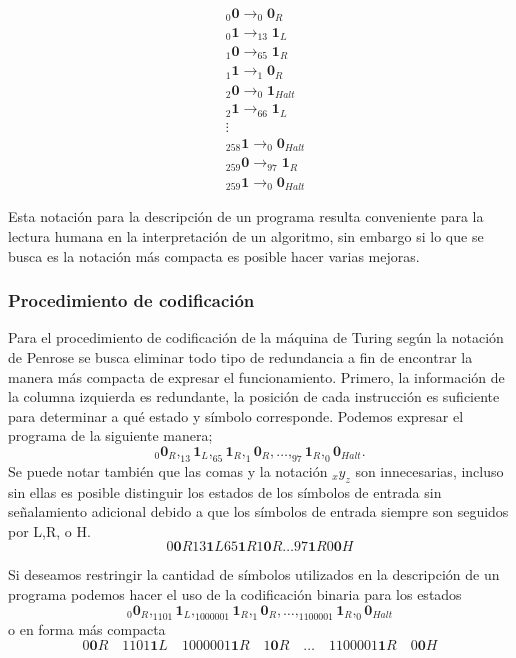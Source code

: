 \documentclass[10pt,a4paper]{article}
\begin{document}
\begin{align*}
	&_{0}\textbf{0} \rightarrow _{0}\textbf{0}_{R} \\
	&_{0}\textbf{1} \rightarrow _{13}\textbf{1}_{L} \\
	&_{1}\textbf{0} \rightarrow _{65}\textbf{1}_{R} \\
	&_{1}\textbf{1} \rightarrow _{1}\textbf{0}_{R} \\
	&_{2}\textbf{0} \rightarrow _{0}\textbf{1}_{Halt} \\
	&_{2}\textbf{1} \rightarrow _{66}\textbf{1}_{L} \\
	& \vdots \\
	&_{258}\textbf{1} \rightarrow _{0}\textbf{0}_{Halt} \\
	&_{259}\textbf{0} \rightarrow _{97}\textbf{1}_{R} \\
	&_{259}\textbf{1} \rightarrow _{0}\textbf{0}_{Halt}
\end{align*}

Esta notación para la descripción de un programa resulta conveniente para la lectura humana en la interpretación de un algoritmo, sin embargo si lo que se busca es la notación más compacta es posible hacer varias mejoras.

\subsubsection{Procedimiento de codificación}
Para el procedimiento de codificación de la máquina de Turing según la notación de Penrose se busca eliminar todo tipo de redundancia a fin de encontrar la manera más compacta de expresar el funcionamiento. Primero, la información de la columna izquierda es redundante, la posición de cada instrucción es suficiente para determinar a qué estado y símbolo corresponde. Podemos expresar el programa de la siguiente manera;
\[
	_{0}\textbf{0}_{R}, _{13}\textbf{1}_{L}, _{65}\textbf{1}_{R}, _{1}\textbf{0}_{R}, \dots, _{97}\textbf{1}_{R}, _{0}\textbf{0}_{Halt}.
\]
Se puede notar también que las comas y la notación $_{x}y_z$ son innecesarias, incluso sin ellas es posible distinguir los estados de los símbolos de entrada sin señalamiento adicional debido a que los símbolos de entrada siempre son seguidos por  L,R, o H.
\[
	0 \textbf{0} R 13 \textbf{1} L 65 \textbf{1} R 1 \textbf{0} R \dots 97 \textbf{1} R 0 \textbf{0} H
\]

Si deseamos restringir la cantidad de símbolos utilizados en la descripción de un programa podemos hacer el uso de la codificación binaria para los estados
\[
	_{0}\textbf{0}_{R}, _{1101}\textbf{1}_{L}, _{1000001}\textbf{1}_{R}, _{1}\textbf{0}_{R}, \dots, _{1100001}\textbf{1}_{R}, _{0}\textbf{0}_{Halt}
\]
o en forma más compacta
\[
	0 \textbf{0} R \quad 1101 \textbf{1} L \quad 1000001 \textbf{1} R \quad 1 \textbf{0} R \quad \dots \quad 1100001 \textbf{1} R \quad 0 \textbf{0} H
\]
\end{document}
